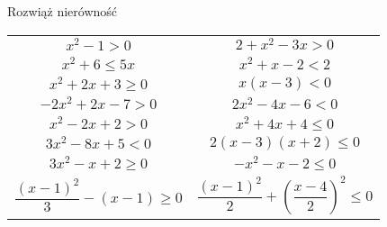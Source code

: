 \documentclass[a4paper,12pt,leqno,fleqn]{article}
\begin{document}
\newpage
Rozwiąż nierówność

\begin{tabularx}{\linewidth}{@{}XX@{}}


  \begin{equation}
    x^2-1>0
  \end{equation}
&
  \begin{equation}
    2+x^2-3x>0
  \end{equation}
\\
  \begin{equation}
    x^2+6\leq5x
  \end{equation}
&
  \begin{equation}
    x^2+x-2<2
  \end{equation}
\\
  \begin{equation}
    x^2+2x+3\geq0
  \end{equation}
&
  \begin{equation}
    x(x-3)<0
  \end{equation}
\\
  \begin{equation}
    -2x^2+2x-7>0
  \end{equation}
&
  \begin{equation}
    2x^2-4x-6<0
  \end{equation}
\\
  \begin{equation}
    x^2-2x+2>0
  \end{equation}
&
  \begin{equation}
    x^2+4x+4\leq0
  \end{equation}
\\
  \begin{equation}
    3x^2-8x+5<0
  \end{equation}
&
  \begin{equation}
    2(x-3)(x+2)\leq0
  \end{equation}
\\
  \begin{equation}
    3x^2-x+2\geq0
  \end{equation}
&
  \begin{equation}
    -x^2-x-2\leq0
  \end{equation}
\\
  \begin{equation}
    \frac{(x-1)^2}{3}-(x-1)\geq0
  \end{equation}
&
  \begin{equation}
    \frac{(x-1)^2}{2}+\left(\frac{x-4}{2}\right)^2\leq0
  \end{equation}

\end{tabularx}
\end{document}
